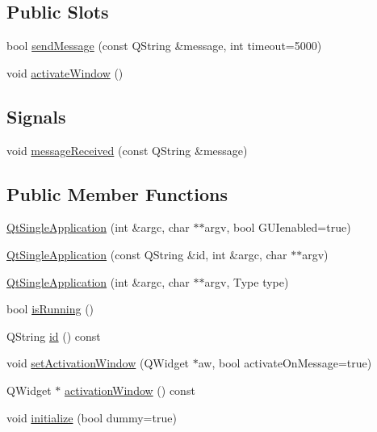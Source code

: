 \subsection*{Public Slots}
\begin{DoxyCompactItemize}
\item 
bool \hyperlink{class_qt_single_application_a0e2f3900f0290913c738ec6b4b959922}{sendMessage} (const QString \&message, int timeout=5000)
\item 
void \hyperlink{class_qt_single_application_a0881b32c76132b499f3180064006abc1}{activateWindow} ()
\end{DoxyCompactItemize}
\subsection*{Signals}
\begin{DoxyCompactItemize}
\item 
void \hyperlink{class_qt_single_application_a69340cef3d26d026e11424930e5a5866}{messageReceived} (const QString \&message)
\end{DoxyCompactItemize}
\subsection*{Public Member Functions}
\begin{DoxyCompactItemize}
\item 
\hyperlink{class_qt_single_application_afe5e96d236e42949e65669eca282acbd}{QtSingleApplication} (int \&argc, char $\ast$$\ast$argv, bool GUIenabled=true)
\item 
\hyperlink{class_qt_single_application_a746192779985e28f22fd17766884518e}{QtSingleApplication} (const QString \&id, int \&argc, char $\ast$$\ast$argv)
\item 
\hyperlink{class_qt_single_application_adcb7a28eec3eef34c6474fb419509895}{QtSingleApplication} (int \&argc, char $\ast$$\ast$argv, Type type)
\item 
bool \hyperlink{class_qt_single_application_aa9f0e6e4f18ac79bbb7a955cd860894d}{isRunning} ()
\item 
QString \hyperlink{class_qt_single_application_affd094410862f30fce83afcba3457b19}{id} () const 
\item 
void \hyperlink{class_qt_single_application_acb5347f6dc6822dbe4d6a78804043528}{setActivationWindow} (QWidget $\ast$aw, bool activateOnMessage=true)
\item 
QWidget $\ast$ \hyperlink{class_qt_single_application_a1e6be5adba2282fcfe547596b2aee18a}{activationWindow} () const 
\item 
void \hyperlink{class_qt_single_application_a622807c60657c1a1fadec15ea5903b47}{initialize} (bool dummy=true)
\end{DoxyCompactItemize}


